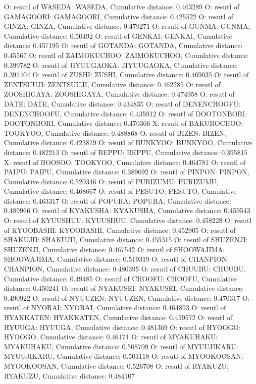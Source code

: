 O: resutl of WASEDA: WASEDA, Cumulative distance: 0.463289
O: resutl of GAMAGOORI: GAMAGOORI, Cumulative distance: 0.425522
O: resutl of GINZA: GINZA, Cumulative distance: 0.479271
O: resutl of GUNMA: GUNMA, Cumulative distance: 0.50492
O: resutl of GENKAI: GENKAI, Cumulative distance: 0.457195
O: resutl of GOTANDA: GOTANDA, Cumulative distance: 0.45567
O: resutl of ZAIMOKUCHOO: ZAIMOKUCHOO, Cumulative distance: 0.399782
O: resutl of JIYUUGAOKA: JIYUUGAOKA, Cumulative distance: 0.397404
O: resutl of ZUSHI: ZUSHI, Cumulative distance: 0.469035
O: resutl of ZENTSUUJI: ZENTSUUJI, Cumulative distance: 0.462285
O: resutl of ZOOSHIGAYA: ZOOSHIGAYA, Cumulative distance: 0.474958
O: resutl of DATE: DATE, Cumulative distance: 0.434835
O: resutl of DENENCHOOFU: DENENCHOOFU, Cumulative distance: 0.435912
O: resutl of DOOTONBORI: DOOTONBORI, Cumulative distance: 0.470366
X: resutl of BAKUROCHOO: TOOKYOO, Cumulative distance: 0.488868
O: resutl of BIZEN: BIZEN, Cumulative distance: 0.423819
O: resutl of BUNKYOO: BUNKYOO, Cumulative distance: 0.482213
O: resutl of BEPPU: BEPPU, Cumulative distance: 0.395815
X: resutl of BOOSOO: TOOKYOO, Cumulative distance: 0.464781
O: resutl of PAIPU: PAIPU, Cumulative distance: 0.389692
O: resutl of PINPON: PINPON, Cumulative distance: 0.520346
O: resutl of PURIZUMU: PURIZUMU, Cumulative distance: 0.468667
O: resutl of PESUTO: PESUTO, Cumulative distance: 0.463317
O: resutl of POPURA: POPURA, Cumulative distance: 0.489966
O: resutl of KYAKUSHA: KYAKUSHA, Cumulative distance: 0.459543
O: resutl of KYUUSHUU: KYUUSHUU, Cumulative distance: 0.458228
O: resutl of KYOOBASHI: KYOOBASHI, Cumulative distance: 0.452905
O: resutl of SHAKUJII: SHAKUJII, Cumulative distance: 0.455315
O: resutl of SHUZENJI: SHUZENJI, Cumulative distance: 0.467542
O: resutl of SHOOWAJIMA: SHOOWAJIMA, Cumulative distance: 0.519319
O: resutl of CHANPION: CHANPION, Cumulative distance: 0.480395
O: resutl of CHUUBU: CHUUBU, Cumulative distance: 0.49485
O: resutl of CHOOFU: CHOOFU, Cumulative distance: 0.450241
O: resutl of NYAKUSEI: NYAKUSEI, Cumulative distance: 0.490922
O: resutl of NYUUZEN: NYUUZEN, Cumulative distance: 0.470317
O: resutl of NYORAI: NYORAI, Cumulative distance: 0.464893
O: resutl of HYAKKATEN: HYAKKATEN, Cumulative distance: 0.459572
O: resutl of HYUUGA: HYUUGA, Cumulative distance: 0.481369
O: resutl of HYOOGO: HYOOGO, Cumulative distance: 0.46171
O: resutl of MYAKUHAKU: MYAKUHAKU, Cumulative distance: 0.508709
O: resutl of MYUUJIKARU: MYUUJIKARU, Cumulative distance: 0.503118
O: resutl of MYOOKOOSAN: MYOOKOOSAN, Cumulative distance: 0.526708
O: resutl of RYAKUZU: RYAKUZU, Cumulative distance: 0.484107
